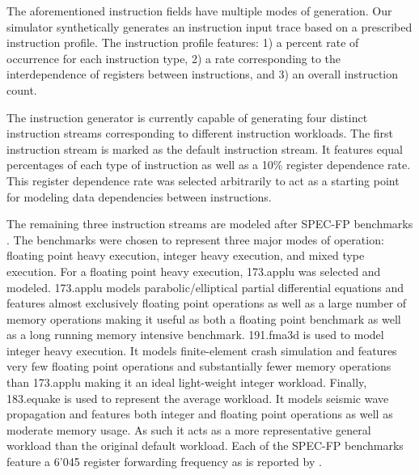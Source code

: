 \documentclass{acm_proc_article-sp}
\begin{document}
The aforementioned instruction fields have multiple modes of generation.  Our simulator synthetically generates an instruction input trace based on a prescribed instruction profile.  The instruction profile features: 1) a percent rate of occurrence for each instruction type, 2) a rate corresponding to the interdependence of registers between instructions, and 3) an overall instruction count.

The instruction generator is currently capable of generating four distinct instruction streams corresponding to different instruction workloads.  The first instruction stream is marked as the default instruction stream.  It features equal percentages of each type of instruction as well as a 10\% register dependence rate.  This register dependence rate was selected arbitrarily to act as a starting point for modeling data dependencies between instructions.

The remaining three instruction streams are modeled after SPEC-FP benchmarks \cite{rupnow}.  The benchmarks were chosen to represent three major modes of operation:  floating point heavy execution, integer heavy execution, and mixed type execution.  For a floating point heavy execution, 173.applu was selected and modeled.  173.applu models parabolic/elliptical partial differential equations and features almost exclusively floating point operations as well as a large number of memory operations making it useful as both a floating point benchmark as well as a long running memory intensive benchmark.  191.fma3d is used to model integer heavy execution.  It models finite-element crash simulation and features very few floating point operations and substantially fewer memory operations than 173.applu making it an ideal light-weight integer workload.  Finally, 183.equake is used to represent the average workload.  It models seismic wave propagation and features both integer and floating point operations as well as moderate memory usage.  As such it acts as a more representative general workload than the original default workload.  Each of the SPEC-FP benchmarks feature a 6{\char'045} register forwarding frequency as is reported by \cite{kucuk}.
\end{document}
